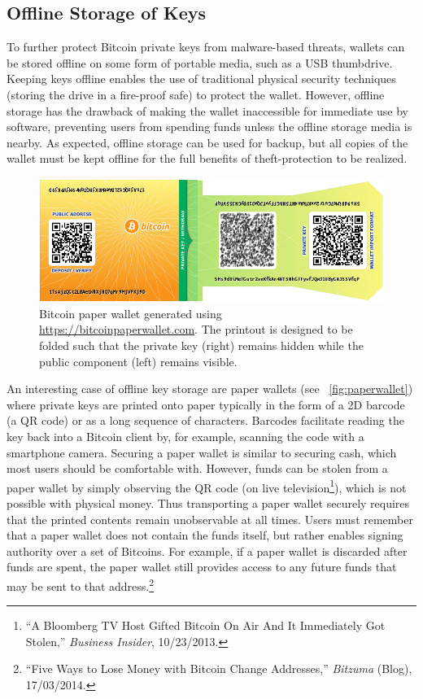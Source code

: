 \subsection{Offline Storage of Keys}
\label{sec:offline storage}
To further protect Bitcoin private keys from malware-based threats, wallets can be stored offline on some form of portable media, such as a USB thumbdrive. Keeping keys offline enables the use of traditional physical security techniques (\eg storing the drive in a fire-proof safe) to protect the wallet. However, offline storage has the drawback of making the wallet inaccessible for immediate use by software, preventing users from spending funds unless the offline storage media is nearby. As expected, offline storage can be used for backup, but all copies of the wallet must be kept offline for the full benefits of theft-protection to be realized.

\begin{figure}[pt]
  \includegraphics[width=.48\textwidth]{figures/paperwallet.png}
  \caption{Bitcoin paper wallet generated using \url{https://bitcoinpaperwallet.com}. The printout is designed to be folded such that the private key (right) remains hidden while the public component (left) remains visible.}
  \label{fig:paperwallet}
\end{figure}

An interesting case of offline key storage are paper wallets (see ~\autoref{fig:paperwallet})
where private keys are printed onto paper typically in the form of a 2D barcode (\eg a QR code) or as a long sequence of characters. Barcodes facilitate reading the key back into a Bitcoin client by, for example, scanning the code with a smartphone camera. Securing a paper wallet is similar to securing cash, which most users should be comfortable with. However, funds can be stolen from a paper wallet by simply observing the QR code (\eg on live television\footnote{``A Bloomberg TV Host Gifted Bitcoin On Air And It Immediately Got Stolen,'' \textit{Business Insider}, 10/23/2013.}), which is not possible with physical money. Thus transporting a paper wallet securely requires that the printed contents remain unobservable at all times.  Users must remember that a paper wallet does not contain the funds itself, but rather enables signing authority over a set of Bitcoins. For example, if a paper wallet is discarded after funds are spent, the paper wallet still provides access to any future funds that may be sent to that address.\footnote{``Five Ways to Lose Money with Bitcoin Change Addresses,'' \textit{Bitzuma} (Blog), 17/03/2014.} 


